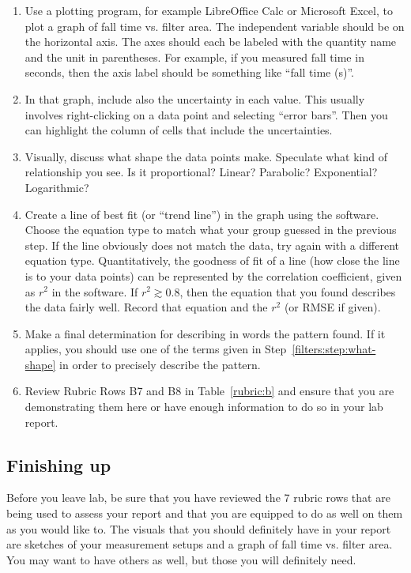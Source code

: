 \begin{enumerate}
	\item Use a plotting program, for example LibreOffice Calc or Microsoft Excel, to plot a graph of fall time vs. filter area. The independent variable should be on the horizontal axis. The axes should each be labeled with the quantity name and the unit in parentheses. For example, if you measured fall time in seconds, then the axis label should be something like ``fall time (s)''.
	
	\item In that graph, include also the uncertainty in each value. This usually involves right-clicking on a data point and selecting ``error bars''. Then you can highlight the column of cells that include the uncertainties.
	
	\item\label{filters:step:what-shape} Visually, discuss what shape the data points make. Speculate what kind of relationship you see. Is it proportional? Linear? Parabolic? Exponential? Logarithmic?
	
	\item Create a line of best fit (or ``trend line'') in the graph using the software. Choose the equation type to match what your group guessed in the previous step. If the line obviously does not match the data, try again with a different equation type. Quantitatively, the goodness of fit of a line (how close the line is to your data points) can be represented by the correlation coefficient, given as $r^2$ in the software. If $r^2 \gtrsim 0.8$, then the equation that you found describes the data fairly well. Record that equation and the $r^2$ (or RMSE if given).
	
	\item Make a final determination for describing in words the pattern found. If it applies, you should use one of the terms given in Step~\ref{filters:step:what-shape} in order to precisely describe the pattern.
	
	\item Review Rubric Rows B7 and B8 in Table~\ref{rubric:b} and ensure that you are demonstrating them here or have enough information to do so in your lab report.
\end{enumerate}

\subsection{Finishing up}

Before you leave lab, be sure that you have reviewed the 7 rubric rows that are being used to assess your report and that you are equipped to do as well on them as you would like to. The visuals that you should definitely have in your report are sketches of your measurement setups and a graph of fall time vs. filter area. You may want to have others as well, but those you will definitely need.

